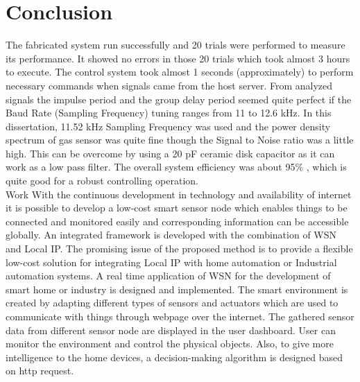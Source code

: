 \chapter{\textbf{Conclusion}}
The fabricated system run successfully and 20 trials were performed to measure its performance. It showed no errors in those 20 trials which took almost 3 hours to execute. The control system took almost 1 seconds (approximately) to perform necessary commands when signals came from the host server. From analyzed signals the impulse period and the group delay period seemed quite perfect if the Baud Rate (Sampling Frequency) tuning ranges from 11 to 12.6 kHz. In this dissertation, 11.52 kHz Sampling Frequency was used and the power density spectrum of gas sensor was quite fine though the Signal to Noise ratio was a little high. This can be overcome by using a 20 pF ceramic disk capacitor as it can work as a low pass filter. The overall system efficiency was about 95$\%$ , which is quite good for a robust controlling operation.\\
Work With the continuous development in technology and availability of internet it is possible to develop a low-cost smart sensor node which enables things to be connected and monitored easily and corresponding information can be accessible globally. An integrated framework is
developed with the combination of WSN and Local IP. The promising issue of the proposed method is to provide a flexible low-cost solution for integrating Local IP  with home automation or Industrial automation systems. A real time application of WSN for the development of smart home or industry is designed and implemented. The smart environment is created by adapting different types of sensors and actuators which are used to communicate with things through webpage over the internet. The gathered sensor data from different sensor node are displayed in the user dashboard. User can monitor the environment and control the physical objects. Also, to give more intelligence to the home devices, a decision-making algorithm is designed based on http request.
